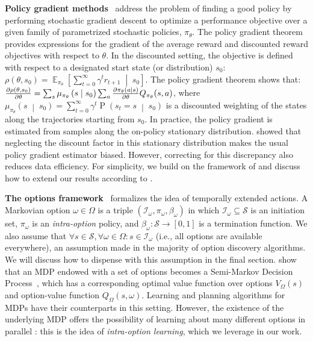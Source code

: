 \documentclass[letterpaper]{article}
\def\given{\;\middle\vert\;}
\DeclareMathOperator*{\expectation}{\mathbb{E}}
\DeclareMathOperator{\prob}{P}
\def\states{\mathcal{S}}
\def\option{\omega}
\begin{document}
{\bf Policy  gradient methods}~\cite{Sutton1999pg,Konda1999}
address the problem of finding a good policy by performing stochastic gradient
descent to optimize a performance objective over a given family of
parametrized stochastic policies, $\pi_{\theta}$. The policy gradient theorem~\cite{Sutton1999pg}
provides expressions for the gradient of the average reward and discounted reward
objectives with respect to $\theta$. In the discounted setting, the objective is
defined with respect to a designated start state (or distribution) $s_0$:
$\rho(\theta, s_0) = \expectation_{\pi_{\theta}}\left[ \sum_{t=0}^\infty \gamma^{t} r_{t+1} \given s_0 \right]$.
The policy gradient theorem shows that: $\deriv[\rho(\theta, s_0)]{\theta} = \sum_{s} \mu_{\pi_\theta}\left( s \given s_0 \right) \sum_a \deriv[ \pi_\theta \left(a | s \right)]{\theta} Q_{\pi_\theta}(s, a)$,
where $\mu_{\pi_\theta}\left(s \given s_0\right) = \sum_{t=0}^\infty \gamma^t \prob\left( s_t = s \given s_0 \right)$ is
a discounted weighting of the states along the trajectories starting from $s_0$.
In practice, the policy gradient is estimated from samples along the on-policy stationary
distribution. \cite{thomas2014bias} showed that neglecting the discount factor
in this stationary distribution makes the usual policy gradient estimator biased.
However, correcting for this discrepancy also reduces data efficiency.
For simplicity, we build on the framework of \cite{Sutton1999pg} and
discuss how to extend our results according to \cite{thomas2014bias}.

{\bf The options framework}~\cite{Sutton1999opt,precup00} formalizes the idea of
temporally extended actions.
A Markovian option $\omega \in \Omega$ is a triple $( \mathcal{I}_\omega, \pi_\omega, \beta_\omega )$
in which $\mathcal{I}_\omega \subseteq \mathcal{S}$ is an initiation set,
$\pi_\omega$ is an \textit{intra-option} policy, and $\beta_\omega: \mathcal{S} \to [0,1]$
is a termination function.
We also assume that $\forall s \in \states, \forall \omega \in \Omega: s \in \mathcal{I}_\omega $
(i.e., all options are available everywhere), an assumption made in the majority
of option discovery algorithms. We will discuss how to dispense with this
assumption in the final section.
\cite{Sutton1999opt,precup00} show that an MDP endowed with a set of options
becomes a Semi-Markov Decision Process~\cite[chapter 11]{Puterman1994},
which has a corresponding optimal value function over options $V_{\Omega}(s)$
and option-value function $Q_{\Omega}(s, \option)$.
Learning and planning algorithms for MDPs have their counterparts in this setting.
However, the existence of the underlying MDP offers the possibility of learning
about many different options in parallel : this is the idea of \textit{intra-option learning},
which we leverage in our work.
\end{document}

